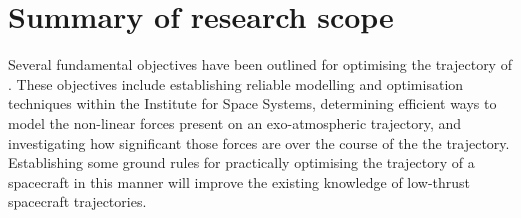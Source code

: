 \section{Summary of research scope} \label{sec:Objective-summary}

Several fundamental objectives have been outlined for optimising the trajectory of \BW. These objectives include establishing reliable modelling and optimisation techniques within the Institute for Space Systems, determining efficient ways to model the non-linear forces present on an exo-atmospheric trajectory, and investigating how significant those forces are over the course of the the trajectory. Establishing some ground rules for practically optimising the trajectory of a spacecraft in this manner will improve the existing knowledge of low-thrust spacecraft trajectories.